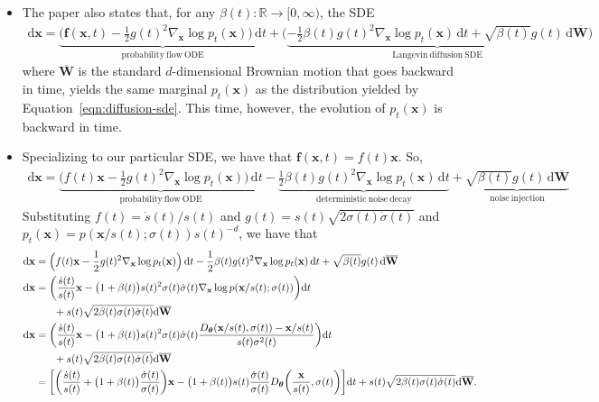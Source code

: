 \documentclass[10pt]{article}
\newcommand{\dee}{\mathrm{d}}
\newcommand{\ve}[1]{\mathbf{#1}}
\newcommand{\ves}[1]{\boldsymbol{#1}}
\newcommand{\Real}{\mathbb{R}}
\begin{document}
\begin{itemize}
  \item The paper also states that, for any $\beta(t): \Real \rightarrow [0,\infty)$, the SDE
  \begin{align}
    \dee\ve{x} = \underbrace{\bigg( \ve{f}(\ve{x},t) - \frac{1}{2}g(t)^2 \nabla_{\ve{x}} \log p_t(\ve{x}) \bigg)\, \dee t}_{\mathrm{probability\ flow\ ODE}} +  \bigg( \underbrace{-\frac{1}{2} \beta(t) g(t)^2 \nabla_{\ve{x}} \log p_t(\ve{x})\, \dee t + \sqrt{\beta(t)} g(t)\, \dee \overline{\ve{W}}}_{\mathrm{Langevin\ diffusion\ SDE}} \bigg) \label{eqn:generalized-reverse-time-diffusion-sde}
  \end{align}
  where $\overline{\ve{W}}$ is the standard $d$-dimensional Brownian motion that goes backward in time, yields the same marginal $p_{t}(\ve{x})$ as the distribution yielded by Equation~\eqref{eqn:diffusion-sde}. This time, however, the evolution of $p_{t}(\ve{x})$ is backward in time.

  \item Specializing to our particular SDE, we have that $\ve{f}(\ve{x},t) = f(t)\ve{x}$. So,
  \begin{align*}
    \dee\ve{x} 
    = \underbrace{\Big( f(t)\ve{x} - \frac{1}{2}g(t)^2 \nabla_{\ve{x}} \log p_t(\ve{x}) \Big) \, \dee t}_{\mathrm{probability\ flow\ ODE}} 
    - \underbrace{ \frac{1}{2} \beta(t) g(t)^2 \nabla_{\ve{x}} \log p_t(\ve{x})\, \dee t}_{\mathrm{deterministic\ noise\ decay}} 
    + \underbrace{\sqrt{\beta(t)} g(t)\, \dee \overline{\ve{W}}}_{\mathrm{noise\ injection}}
  \end{align*}
  Substituting $f(t) = \dot{s}(t)/s(t)$ and $g(t) = s(t)\sqrt{2\sigma(t)\dot{\sigma}(t)}$ and $p_t(\ve{x}) = p(\ve{x}/s(t); \sigma(t)) s(t)^{-d}$, we have that
  \begin{align}
    \dee\ve{x} 
    &= \Big( f(t)\ve{x} - \frac{1}{2}g(t)^2 \nabla_{\ve{x}} \log p_t(\ve{x}) \Big) \, \dee t
    - \frac{1}{2} \beta(t) g(t)^2 \nabla_{\ve{x}} \log p_t(\ve{x})\, \dee t
    + \sqrt{\beta(t)} g(t)\, \dee \overline{\ve{W}} \notag \\
    \dee\ve{x}
    &= \bigg( \frac{\dot{s}(t)}{s(t)}\ve{x} - \big(1 + \beta(t)\big)s(t)^2 \sigma(t)\dot{\sigma}(t) \nabla_{\ve{x}} \log p(\ve{x}/s(t);\sigma(t)) \bigg) \dee t \notag \\
    &\phantom{=} \quad + s(t) \sqrt{2 \beta(t)\sigma(t)\dot{\sigma}(t)} \dee \overline{\ve{W}} \notag \\
    \dee\ve{x}
    &= \bigg( \frac{\dot{s}(t)}{s(t)}\ve{x} - \big(1 + \beta(t)\big)s(t)^2 \sigma(t)\dot{\sigma}(t) \frac{D_{\ves{\theta}}(\ve{x}/s(t), \sigma(t)) - \ve{x}/s(t)}{s(t)\sigma^2(t)} \bigg) \dee t \notag \\
    &\phantom{=} \quad + s(t) \sqrt{2 \beta(t)\sigma(t)\dot{\sigma}(t)} \dee \overline{\ve{W}} \notag \\
    &= \bigg[ \bigg( \frac{\dot{s}(t)}{s(t)} + \big(1 + \beta(t)\big)\frac{\dot{\sigma}(t)}{\sigma(t)} \bigg)\ve{x} - \big( 1 + \beta(t) \big)s(t) \frac{\dot{\sigma}(t)}{\sigma(t)} D_{\ves{\theta}}\bigg( \frac{\ve{x}}{s(t)}, \sigma(t) \bigg)  \bigg]\dee t 
    + s(t) \sqrt{2 \beta(t)\sigma(t)\dot{\sigma}(t)} \dee \overline{\ve{W}}.  \label{eqn:generalized-noise-added-sde}
  \end{align}


\end{itemize}
\end{document}
